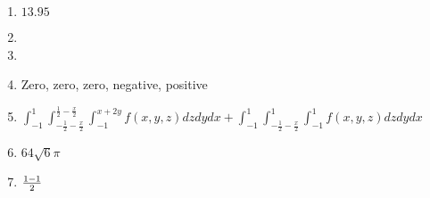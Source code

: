 \documentclass[12pt]{article}
\let\cos\relax\DeclareMathOperator{\cos}{\mathsf{cos}}
\begin{document}
\begin{enumerate}
\item $13.95$
\item
\item
\item Zero, zero, zero, negative, positive
\item $\int_{-1}^1\int_{-\frac{1}{2}-\frac{x}{2}}
^{\frac{1}{2}-\frac{x}{2}}\int_{-1}^{x+2y}
f\left(x,y,z\right)dzdydx
+\int_{-1}^1\int_{-\frac{1}{2}-\frac{x}{2}}
^1\int_{-1}^1
f\left(x,y,z\right)dzdydx$
\item $64\sqrt{6}\pi$
\item $\frac{1-\cos{1}}{2}$
\end{enumerate}
\end{document}
